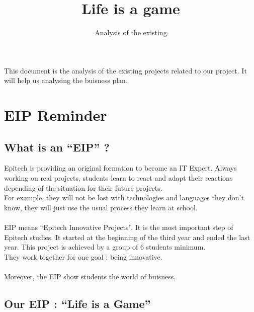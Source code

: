 \documentclass{life-en}
\begin{document}
\title{Life is a game}
\subtitle{Analysis of the existing}

\summary
{
  This document is the analysis of the existing projects related to our
  project. It will help us analysing the buisness plan.
}

\maketitle

\tableofcontents

\chapter{EIP Reminder}

\section{What is an “EIP” ?}

Epitech is providing an original formation to become an IT Expert. Always working on real projects, students learn to react and adapt their reactions depending of the situation for their future projects.\\

For example, they will not be lost with technologies and languages they don’t know, they will just use the usual process they learn at school.\\
\\

EIP means “Epitech Innovative Projects”. It is the most important step of Epitech studies. It started at the beginning of the third year and ended the last year. This project is achieved by a group of 6 students minimum.\\

They work together for one goal : being innovative.\\
\\

Moreover, the EIP show students the world of buisness.

\section{Our EIP : “Life is a Game”}
\end{document}
